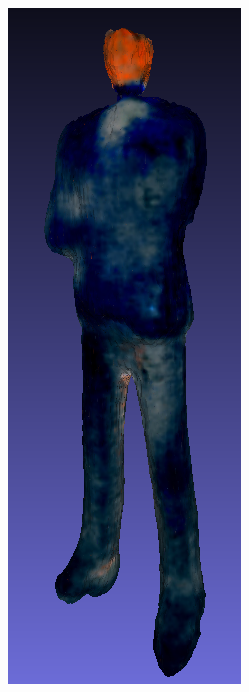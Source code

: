 \begin{figure}[H]
    \centering
    \small
    \begin{subfigure}[b]{0.116\textwidth}
        \centering
        \includegraphics[width=\textwidth]{etc/bias/bias_ceo_dreamfusion.png}

\end{subfigure}
\end{figure}
